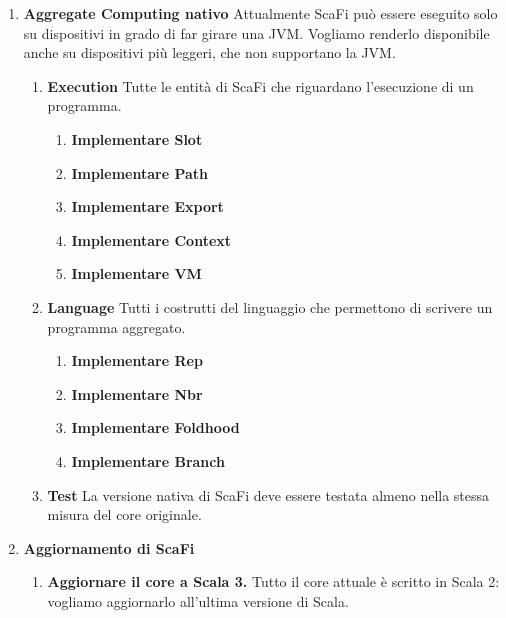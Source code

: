 \documentclass[12pt, a4paper]{article}
\begin{document}
\begin{enumerate}
    \item \textbf{Aggregate Computing nativo} Attualmente ScaFi può essere eseguito solo su dispositivi in grado di 
    far girare una JVM. Vogliamo renderlo disponibile anche su dispositivi più leggeri, che non supportano la JVM.
        \begin{enumerate}
            \item \textbf{Execution} Tutte le entità di ScaFi che riguardano l'esecuzione di un programma.
                \begin{enumerate}
                    \item \textbf{Implementare Slot} 
                    \item \textbf{Implementare Path}
                    \item \textbf{Implementare Export}
                    \item \textbf{Implementare Context}
                    \item \textbf{Implementare VM}
                \end{enumerate}

            \item \textbf{Language} Tutti i costrutti del linguaggio che permettono di scrivere un programma aggregato.
                \begin{enumerate}
                    \item \textbf{Implementare Rep}
                    \item \textbf{Implementare Nbr}
                    \item \textbf{Implementare Foldhood}
                    \item \textbf{Implementare Branch}
                \end{enumerate}

            \item \textbf{Test} La versione nativa di ScaFi deve essere testata almeno nella stessa misura del core 
            originale.
        \end{enumerate}

    \item \textbf{Aggiornamento di ScaFi}
        \begin{enumerate}
            \item \textbf{Aggiornare il core a Scala 3.} Tutto il core attuale è scritto in Scala 2: vogliamo aggiornarlo 
            all'ultima versione di Scala.
            

\end{enumerate}
\end{enumerate}
\end{document}
